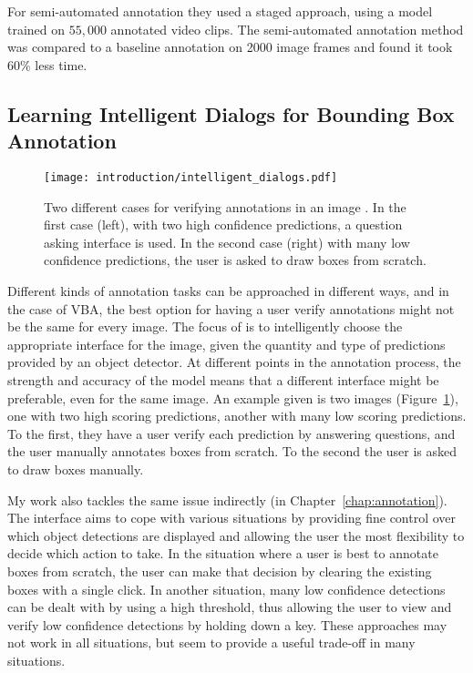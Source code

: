 For semi-automated annotation they used a staged approach, using a model trained on $55,000$ annotated video clips. The semi-automated annotation method was compared to a baseline annotation on 2000 image frames and found it took $60\%$ less time.

\subsection{Learning Intelligent Dialogs for Bounding Box Annotation}

\begin{figure}[h]
  \centering
  \texttt{[image: introduction/intelligent\_dialogs.pdf]}
  \caption{Two different cases for verifying annotations in an image \cite{Konyushkova2017}. In the first case (left), with two high confidence predictions, a question asking interface is used. In the second case (right) with many low confidence predictions, the user is asked to draw boxes from scratch. }
  \label{fig:intelligent_dialogs}
\end{figure}

Different kinds of annotation tasks can be approached in different ways, and in the case of \gls{VBA}, the best option for having a user verify annotations might not be the same for every image. The focus of \cite{Konyushkova2017} is to intelligently choose the appropriate interface for the image, given the quantity and type of predictions provided by an object detector. At different points in the annotation process, the strength and accuracy of the model means that a different interface might be preferable, even for the same image. An example given is two images (Figure~\ref{fig:intelligent_dialogs}), one with two high scoring predictions, another with many low scoring predictions. To the first, they have a user verify each prediction by answering questions, and the user manually annotates boxes from scratch. To the second the user is asked to draw boxes manually. 


My work also tackles the same issue indirectly (in Chapter~\ref{chap:annotation}). The interface aims to cope with various situations by providing fine control over which object detections are displayed and allowing the user the most flexibility to decide which action to take. In the situation where a user is best to annotate boxes from scratch, the user can make that decision by clearing the existing boxes with a single click. In another situation, many low confidence detections can be dealt with by using a high threshold, thus allowing the user to view and verify low confidence detections by holding down a key. These approaches may not work in all situations, but seem to provide a useful trade-off in many situations.

